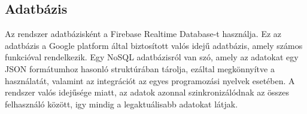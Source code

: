 \subsection{Adatbázis}

Az rendszer adatbázisként a Firebase Realtime Database-t használja. Ez az adatbázis a Google platform által biztosított valós idejű adatbázis, amely számos funkcióval rendelkezik. Egy NoSQL adatbázisról van szó, amely az adatokat egy JSON formátumhoz hasonló struktúrában tárolja, ezáltal megkönnyítve a használatát, valamint az integrációt az egyes programozási nyelvek esetében. A rendszer valós idejűsége miatt, az adatok azonnal szinkronizálódnak az összes felhasználó között, igy mindig a legaktuálisabb adatokat látjak.

